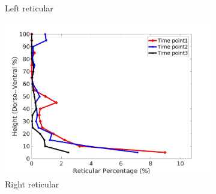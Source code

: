 \begin{figure}[H]
\begin{subfigure}{.42\linewidth}
  \caption{Left reticular}
  \label{fig:IPF9DiseaseDorsoToVentral-c} 
\end{subfigure} 
\begin{subfigure}{.42\linewidth}%
  \includegraphics[width=\linewidth,trim={{.0\wd0} {.0\wd0} {.0\wd0} {.0\wd0}},clip]{Appendix/Image_AppexA/DorsoToVentral/IPF9RightLungReticularDiseaseDorsoToVentral.jpg}
  \caption{Right reticular}
  \label{fig:IPF9DiseaseDorsoToVentral-d}
\end{subfigure}
\begin{subfigure}{.42\linewidth}%

\end{subfigure}
\end{figure}
